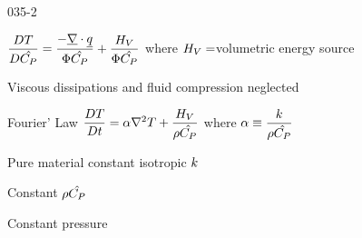 \begin{mitframe}{035-2}

\begin{listone}

\item $\dfrac{\elecdisplace\Temp}{\elecdisplace\hat{\cp}}=\dfrac{-\gradop\cdot\uline{\heatflux}}{\diss\hat{\cp}}+\dfrac{\enthalpy_{\vol}}{\diss\hat{\cp}}$ where $\enthalpy_{\vol}=$volumetric energy source

		\begin{listtwo}

        			\item Viscous dissipations and fluid compression neglected

			                
         \item Fourier' Law $\dfrac{\elecdisplace\Temp}{\elecdisplace{t}}=\tdiff\nabla^{2}\Temp+\dfrac{\enthalpy_{\vol}}{\dens\hat{\cp}}$ where $\tdiff\equiv\dfrac{\thermcond}{\dens\hat{\cp}}$
         				\begin{listthree}
                        
                        \item Pure material constant isotropic $\thermcond$
                        
                        \item Constant $\dens\hat{\cp}$
                
                					\begin{listfour}
                                    
                                    \item Constant pressure

									\end{listfour}
%
						\end{listthree}
         
		\end{listtwo}
\end{listone}
\end{mitframe}